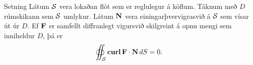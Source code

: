 \begin{frame}{} 

\begin {block}{Setning \rtask{}}
Látum $\cal S$ vera lokaðan flöt sem er
reglulegur á köflum.  Táknum með $D$ rúmskikann sem $\cal S$ umlykur.
Látum $\mbox{${\bf N}$}$ vera einingarþvervigrasvið á $\cal S$   sem vísar út úr
$D$.  Ef $\mbox{${\bf F}$}$ er samfellt diffranlegt vigursvið skilgreint á opnu
mengi sem inniheldur $D$, 
þá er 
$$\oiint_{\cal S}\mbox{${\rm\bf curl\,}$}\mbox{${\bf F}$}\cdot\mbox{${\bf N}$}\,dS=0.$$
\end{block}

\end{frame}

